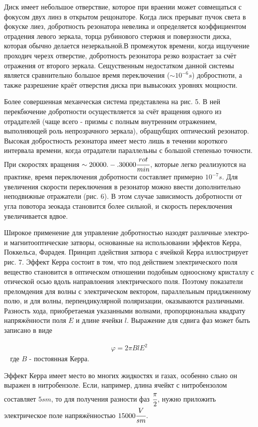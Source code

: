 \documentclass[a4paper,14pt,russian]{article}
\begin{document}
Диск имеет небольшое отверствие, которое при враении может совмещаться с фокусом двух линз в открытом рещонаторе. Когда лиск прерыват пучок света в фокуске лиез, добротность резонатора невелика и определяется коэффициентом отрадения левого зеркала, торца рубинового стержня и поверзности диска, которая обычно делается незеркальной.В промежуток времени, когда ищлучение проходич черезх отверстие, добротность резонатора резко возрастает за счёт отражения от второго зеркала. Сещуственным недостатком данной системы является сравнительно большое время переключения ($\sim 10^{-6} s$) добростноти, а также разрешение краёт отверстия диска при вывысоких уровнях мощности.

Более совершенная механческая система представлена на рис. 5. В ней перекбючение добротности осуществляется за счёт вращения одного из отрадателей (чаще всего - призмы с полным внутренним отражением, выполняющей роль непрозрачного зеркала), обращубщих оптический резонатор. Высокая добростность резонатора имеет место лишь в течении короткого интервала времени, когда отрадатели параллельны с большой степенью точности. При скоростях вращения $\sim 20000 .-. 30000 \cfrac {rot} {min}$, которые легко реализуются на практике, время переключения добротности составляет примерно $10^{-7} s$. Для увеличения скорости переключения в резонатор можно ввести дополнительно неподвижные отражатели (рис. 6). В этом случае зависимость добротности от угла повотора зеокада становится более сильной, и скорость переключения увеличивается вдвое.

Широкое применение для управление добротностью назодят различные электро- и магнитооптические затворы, основанные на использовании эффектов Керра, Поккельса, Фарадея. Принцип лдействия затвора с ячейкой Керра иллюстрирует рис. 7. Эффект Керра состоит в том, что под действием электрического поля вещество становится в оптическом отношении подобным одноосному кристаллу с отической осью вдоль направлоения электрического поля. Поэтому показатели преломдения для волны с электрическом вектором, параллельным придлженному полю, и для волны, перпендикулярной поляризации, оказываются различными. Разность хода, приобретаемая указанными волнами, пропорциональна квадрату напряжённости поля $E$ и длине ячейки $l$. Выражение для сдвига фаз может быть записано в виде


\begin{eqnarray}
\varphi = 2 \pi B l E^2
\end{eqnarray}
$\;\;$ где $B$ - постоянная Керра.

Эффект Керра имеет место во многих жидкостях и газах, особенно сльно он выражен в нитробензоле. Если, например, длина ячейкт с нитробензолом составляет $5 sm$, то для получения разности фаз $\cfrac {\pi} {2}$, нужно приложить электрическое поле напряжённостью $15000 \cfrac {V} {sm}$.
\end{document}
